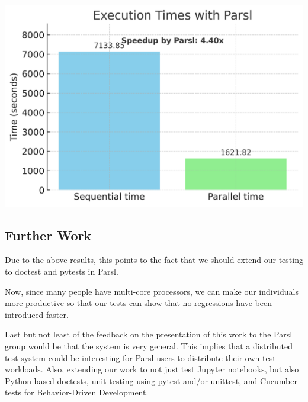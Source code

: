 \begin{center}
    \centering
    \includegraphics[width=.7\textwidth]{booktests/parsl_speedup_chart_no_x_lines.png}
    \label{fig:parsl_speedup}
\end{center}

\subsection{Further Work}

Due to the above results, this points to the fact that we should extend our testing to doctest and pytests in Parsl.

Now, since many people have multi-core processors, we can make our individuals more productive so that our tests can show that no regressions have been introduced faster.

Last but not least of the feedback on the presentation of this work to the Parsl group would be that the system is very general. This implies that a distributed test system could be interesting for Parsl users to distribute their own test workloads. 
Also, extending our work to not just test Jupyter notebooks, but also Python-based doctests, unit testing using pytest and/or unittest, and Cucumber tests for Behavior-Driven Development.


